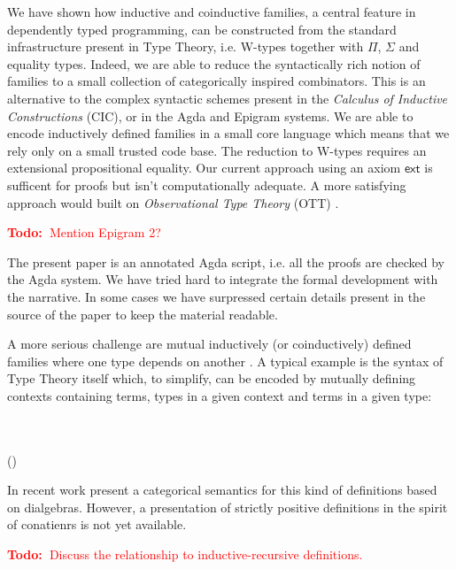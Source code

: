 \documentclass[a4paper]{article}
\newcommand{\todo}[1]{\textcolor{red}{\textbf{Todo:~}#1}}
\newcommand{\Conid}[1]{\mathit{#1}}
\newcommand{\Varid}[1]{\mathit{#1}}
\def\resethooks{%
  \global\let\SaveRestoreHook\empty
  \global\let\ColumnHook\empty}
\let\hspre\empty
\let\hspost\empty
\renewcommand\Varid[1]{\mathord{\textsf{#1}}}
\let\Conid\Varid
\begin{document}
We have shown how inductive and coinductive families, a central
feature in dependently typed programming, can be constructed from the
standard infrastructure present in Type Theory, i.e. W-types together
with $\Pi$, $\Sigma$ and equality types. Indeed, we are able to reduce
the syntactically rich notion of families to a small collection of
categorically inspired combinators. This is an alternative to the
complex syntactic schemes present in the \emph{Calculus of Inductive
  Constructions} (CIC), or in the Agda and Epigram systems. We are
able to encode inductively defined families in a small core language
which means that we rely only on a small trusted code base. The
reduction to W-types requires an extensional propositional
equality. Our current approach using an axiom \ensuremath{\Varid{ext}} is sufficent for
proofs but isn't computationally adequate. A more satisfying approach
would built on \emph{Observational Type Theory} (OTT)
\cite{alti:ott-conf}.

\todo{Mention Epigram 2?}

The present paper is an annotated Agda script, i.e. all the proofs are
checked by the Agda system. We have tried hard to integrate the formal
development with the narrative. In some cases we have surpressed
certain details present in the source of the paper to keep the
material readable.

A more serious challenge are mutual inductively (or coinductively)
defined families where one type depends on another
\cite{setzer-forsberg-indind}. A typical example is the syntax of Type
Theory itself which, to simplify, can be encoded by mutually defining
contexts containing terms, types in a given context and terms in a
given type:
\begin{hscode}\SaveRestoreHook
\column{B}{@{}>{\hspre}l<{\hspost}@{}}%
\column{E}{@{}>{\hspre}l<{\hspost}@{}}%
\>[B]{}\Conid{Con}\;\in\;\Conid{Set}{}\<[E]%
\\
\>[B]{}\Conid{Ty}\;\in\;\Conid{Con}\;\rightarrow\;\Conid{Set}{}\<[E]%
\\
\>[B]{}\Conid{Tm}\;\in\;(\Gamma\;\in\;\Conid{Con})\;\rightarrow\;\Conid{Ty}\;\Gamma\;\rightarrow\;\Conid{Set}{}\<[E]%
\ColumnHook
\end{hscode}\resethooks
In recent work \cite{calco-indind} present a categorical semantics for
this kind of definitions based on dialgebras. However, a presentation
of strictly positive definitions in the spirit of conatienrs is not
yet available.

\todo{Discuss the relationship to inductive-recursive definitions.}



\end{document}
